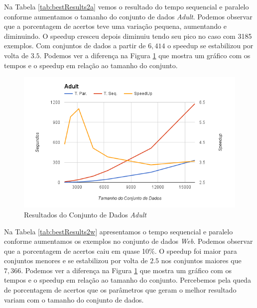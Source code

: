 Na Tabela \ref{tab:bestResults2a} vemos o resultado do tempo sequencial e paralelo conforme aumentamos o tamanho do conjunto de dados \emph{Adult}. Podemos observar que a porcentagem de acertos teve uma variação pequena, aumentando e diminuindo. O speedup cresceu depois diminuiu tendo seu pico no caso com 3185 exemplos. Com conjuntos de dados a partir de $6,414$ o speedup se estabilizou por volta de $3.5$. Podemos ver a diferença na Figura \ref{fig:GraficoAdult} que mostra um gráfico com os tempos e o speedup em relação ao tamanho do conjunto.



\begin{figure}
  \centering
  \includegraphics[width=1\textwidth]{imagens/GraficoAdult.png}
  \caption{Resultados do Conjunto de Dados \emph{Adult}}
  \label{fig:GraficoAdult}
\end{figure}


Na Tabela \ref{tab:bestResults2w} apresentamos o tempo sequencial e paralelo conforme aumentamos os exemplos no conjunto de dados \emph{Web}. Podemos observar que a porcentagem de acertos caiu em quase 10\%. O speedup foi maior para conjuntos menores e se estabilizou por volta de $2.5$ nos conjuntos maiores que $7,366$. Podemos ver a diferença na Figura \ref{fig:GraficoAdult} que mostra um gráfico com os tempos e o speedup em relação ao tamanho do conjunto. Percebemos pela queda de porcentagem de acertos que os parâmetros que geram o melhor resultado variam com o tamanho do conjunto de dados.

